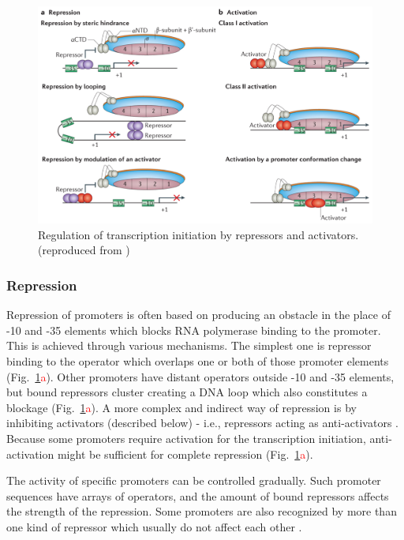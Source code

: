 \begin{figure}[ht!]
  \centering
  \includegraphics[scale=0.4]{text/Pictures/TxnInitRegulation.png}
    \caption{Regulation of transcription initiation by repressors and activators. (reproduced from \cite{browning2016local})}
    \label{txn}
\end{figure}

\subsubsection{Repression}
Repression of promoters is often based on producing an obstacle in the place of -10 and -35 elements which blocks RNA polymerase binding to the promoter.
This is achieved through various mechanisms.
The simplest one is repressor binding to the operator which overlaps one or both of those promoter elements \cite{brent1981mechanism} (Fig.~\ref{txn}\textcolor{red}{a}).
Other promoters have distant operators outside -10 and -35 elements, but bound repressors cluster creating a DNA loop which also constitutes a blockage \cite{semsey2004dna} (Fig.~\ref{txn}\textcolor{red}{a}).
A more complex and indirect way of repression is by inhibiting activators (described below) - i.e., repressors acting as anti-activators \cite{sogaard1993protein}.
Because some promoters require activation for the transcription initiation, anti-activation might be sufficient for complete repression (Fig.~\ref{txn}\textcolor{red}{a}).

The activity of specific promoters can be controlled gradually.
Such promoter sequences have arrays of operators, and the amount of bound repressors affects the strength of the repression.
Some promoters are also recognized by more than one kind of repressor which usually do not affect each other \cite{el2009repression}.

